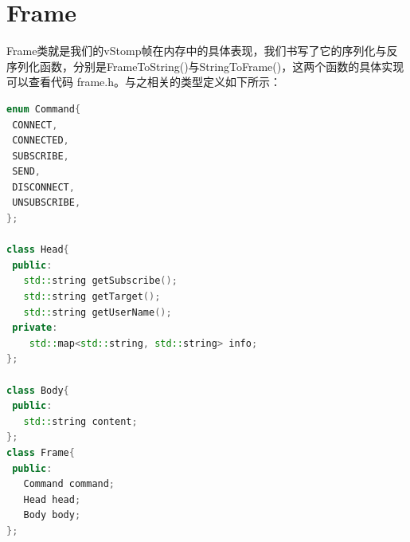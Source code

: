 \documentclass{ctexrep}
\begin{document}
	\section{Frame}
	Frame类就是我们的vStomp帧在内存中的具体表现，我们书写了它的序列化与反序列化函数，分别是FrameToString()与StringToFrame()，这两个函数的具体实现可以查看代码 frame.h。与之相关的类型定义如下所示：\begin{lstlisting}[language=c++]
enum Command{
 CONNECT,
 CONNECTED,
 SUBSCRIBE,
 SEND,
 DISCONNECT,
 UNSUBSCRIBE,
};

class Head{
 public:
   std::string getSubscribe();
   std::string getTarget();
   std::string getUserName();
 private: 
    std::map<std::string, std::string> info;
};

class Body{
 public:
   std::string content;
};
class Frame{
 public:
   Command command;
   Head head;
   Body body;
};
	\end{lstlisting}
\end{document}
